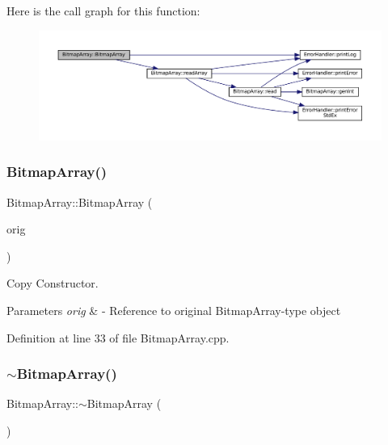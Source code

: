 Here is the call graph for this function\+:
\nopagebreak
\begin{figure}[H]
\begin{center}
\leavevmode
\includegraphics[width=350pt]{classBitmapArray_ae11059a1f2f1af199d0a2cf6f316397d_cgraph}
\end{center}
\end{figure}
\mbox{\label{classBitmapArray_a07ce0273af824a8deff592ef1a43d7e5}} 
\subsubsection{\texorpdfstring{BitmapArray()}{BitmapArray()}\hspace{0.1cm}{\footnotesize\ttfamily [3/3]}}
{\footnotesize\ttfamily Bitmap\+Array\+::\+Bitmap\+Array (\begin{DoxyParamCaption}\item[{const \mbox{\hyperlink{classBitmapArray}{Bitmap\+Array}} \&}]{orig }\end{DoxyParamCaption})}



Copy Constructor. 


\begin{DoxyParams}{Parameters}
{\em orig} & -\/ Reference to original Bitmap\+Array-\/type object \\
\hline
\end{DoxyParams}


Definition at line 33 of file Bitmap\+Array.\+cpp.

\mbox{\label{classBitmapArray_acc21c3148de08fb85d2939821f9f2cf0}} 
\subsubsection{\texorpdfstring{$\sim$BitmapArray()}{~BitmapArray()}}
{\footnotesize\ttfamily Bitmap\+Array\+::$\sim$\+Bitmap\+Array (\begin{DoxyParamCaption}{ }\end{DoxyParamCaption})\hspace{0.3cm}{\ttfamily [virtual]}}

